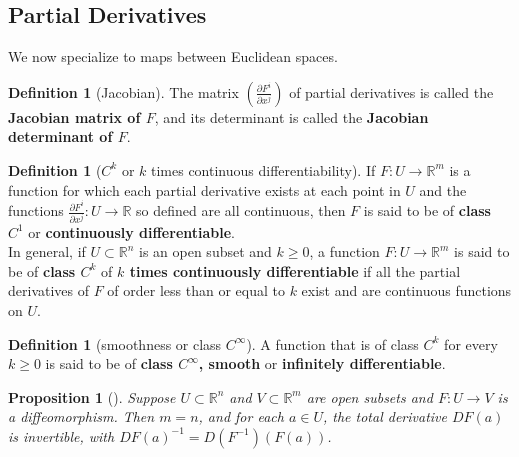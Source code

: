 \documentclass[reqno]{amsart}
\theoremstyle{plain}%
\newtheorem{proposition}[theorem]{Proposition}
\theoremstyle{definition}
\newtheorem{definition}[theorem]{Definition}
\theoremstyle{remark}
\begin{document}
    \subsection*{Partial Derivatives}
        We now specialize to maps between Euclidean spaces.
        \begin{definition}[Jacobian]
            The matrix $\left( \frac{\partial F^{i}}{\partial x^{j}} \right) $ of
            partial derivatives is called the \textbf{Jacobian matrix of $F$}, and its
            determinant is called the \textbf{Jacobian determinant of $F$}.
        \end{definition}

        \begin{definition}[$C^{k}$ or $k$ times continuous differentiability]
        If $F  \colon U \to \mathbb{R}^{m}$ is a function for which each partial
        derivative exists at each point in $U$ and the functions
        $\frac{\partial F^{i}}{\partial x^{j}}  \colon U \to \mathbb{R}$ so defined
        are all continuous, then $F$ is said to be of
        \textbf{class $C^{1}$} or \textbf{continuously differentiable}.\\
        In general, if $U \subset \mathbb{R}^{n}$ is an open subset and $k \ge 0$,
        a function $F  \colon U \to \mathbb{R}^{m}$ is said to be of \textbf{class
        $C^{k}$} of \textbf{$k$ times continuously differentiable} if all the
        partial derivatives of $F$ of order less than or equal to $k$ exist and are
        continuous functions on $U$.
        \end{definition}

        \begin{definition}[smoothness or class $C^{\infty}$]
        A function that is of class $C^{k}$ for every $k \ge 0$ is said to be of
        \textbf{class $C^{\infty}$, smooth} or \textbf{infinitely differentiable}.
        \end{definition}

        \begin{proposition}[]\label{diffeo-derivative-invertible}
        Suppose $U \subset \mathbb{R}^{n}$ and $V \subset \mathbb{R}^{m}$ are open
        subsets and $F  \colon U \to V$ is a diffeomorphism. Then
        $m = n$, and for each $a \in U$, the total derivative $DF (a)$ is
        invertible, with $DF(a)^{-1} = D\left( F^{-1} \right) \left( 
        F(a) \right) $.
        \end{proposition}
\end{document}
